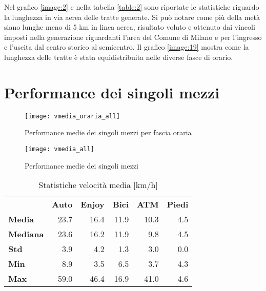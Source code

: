 Nel grafico \ref{image:2} e nella tabella \ref{table:2} sono riportate le statistiche riguardo la lunghezza in via aerea delle tratte generate. Si può notare come più della metà siano lunghe meno di 5 km in linea aerea, risultato voluto e ottenuto dai vincoli imposti nella generazione riguardanti l'area del Comune di Milano e per l'ingresso e l'uscita dal centro storico al semicentro. Il grafico \ref{image:19} mostra come la lunghezza delle tratte è stata equidistribuita nelle diverse fasce di orario.

\section{Performance dei singoli mezzi}

\begin{figure}[H]
\texttt{[image: vmedia\_oraria\_all]}
\caption{Performance medie dei singoli mezzi per fascia oraria}
\label{image:15}
\end{figure}

\begin{figure}[H]
	\texttt{[image: vmedia\_all]}
	\caption{Performance medie dei singoli mezzi}
	\label{image:26}
\end{figure}

\begin{table}[H]
\centering
\begin{tabular}{ | l r r r r r | }
\hline
& \textbf{Auto} & \textbf{Enjoy} & \textbf{Bici} & \textbf{ATM} & \textbf{Piedi} \\
\textbf{Media}      & 23.7 & 16.4 & 11.9 & 10.3 & 4.5 \\
\textbf{Mediana} & 23.6 & 16.2 & 11.9 &   9.8 & 4.5 \\
\textbf{Std}             &  3.9 &   4.2 &   1.3 &    3.0 & 0.0 \\
\textbf{Min}            &  8.9 &   3.5 &   6.5 &    3.7 & 4.3 \\
\textbf{Max}         & 59.0 & 46.4 & 16.9 &  41.0 & 4.6 \\
\hline
\end{tabular}
\caption{Statistiche velocità media [km/h]}
\label{table:3}
\end{table}

